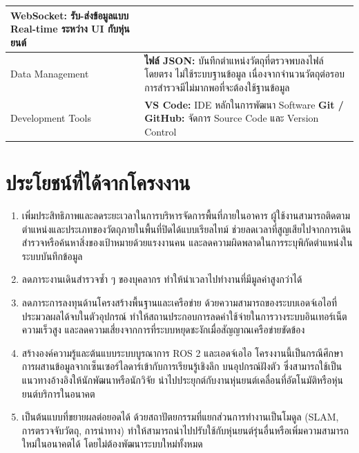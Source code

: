 \documentclass[a4paper,12pt]{report}
\begin{document}
\begin{table}[htbp]
\begin{tabularx}{\textwidth}{|>{\raggedright\arraybackslash}p{3.2cm}|X|}
\textbf{WebSocket:} รับ-ส่งข้อมูลแบบ Real-time ระหว่าง UI กับหุ่นยนต์ \\
\hline
Data Management &
\textbf{ไฟล์ JSON:} บันทึกตำแหน่งวัตถุที่ตรวจพบลงไฟล์โดยตรง ไม่ใช้ระบบฐานข้อมูล \newline
เนื่องจากจำนวนวัตถุต่อรอบการสำรวจมีไม่มากพอที่จะต้องใช้ฐานข้อมูล \\
\hline
Development Tools &
\textbf{VS Code:} IDE หลักในการพัฒนา Software \newline
\textbf{Git / GitHub:} จัดการ Source Code และ Version Control \\
\hline
\end{tabularx}
\end{table}

\section{ประโยชน์ที่ได้จากโครงงาน}

\begin{enumerate}[label=\arabic*., leftmargin=1.25cm, itemsep=6pt, topsep=6pt]
    \item เพิ่มประสิทธิภาพและลดระยะเวลาในการบริหารจัดการพื้นที่ภายในอาคาร
    ผู้ใช้งานสามารถติดตามตำแหน่งและประเภทของวัตถุภายในพื้นที่ปิดได้แบบเรียลไทม์
    ช่วยลดเวลาที่สูญเสียไปจากการเดินสำรวจหรือค้นหาสิ่งของเป้าหมายด้วยแรงงานคน
    และลดความผิดพลาดในการระบุพิกัดตำแหน่งในระบบบันทึกข้อมูล

    \item ลดภาระงานเดินสำรวจซ้ำ ๆ ของบุคลากร
    ทำให้นำเวลาไปทำงานที่มีมูลค่าสูงกว่าได้

    \item ลดภาระการลงทุนด้านโครงสร้างพื้นฐานและเครือข่าย
    ด้วยความสามารถของระบบเอดจ์เอไอที่ประมวลผลได้จบในตัวอุปกรณ์
    ทำให้สถานประกอบการลดค่าใช้จ่ายในการวางระบบอินเทอร์เน็ตความเร็วสูง
    และลดความเสี่ยงจากการที่ระบบหยุดชะงักเมื่อสัญญาณเครือข่ายขัดข้อง

    \item สร้างองค์ความรู้และต้นแบบระบบบูรณาการ ROS 2 และเอดจ์เอไอ
    โครงงานนี้เป็นกรณีศึกษาการผสานข้อมูลจากเซ็นเซอร์ไลดาร์เข้ากับการเรียนรู้เชิงลึก
    บนอุปกรณ์ฝังตัว ซึ่งสามารถใช้เป็นแนวทางอ้างอิงให้นักพัฒนาหรือนักวิจัย
    นำไปประยุกต์กับงานหุ่นยนต์เคลื่อนที่อัตโนมัติหรือหุ่นยนต์บริการในอนาคต

    \item เป็นต้นแบบที่ขยายผลต่อยอดได้
    ด้วยสถาปัตยกรรมที่แยกส่วนการทำงานเป็นโมดูล
    (SLAM, การตรวจจับวัตถุ, การนำทาง)
    ทำให้สามารถนำไปปรับใช้กับหุ่นยนต์รุ่นอื่นหรือเพิ่มความสามารถใหม่ในอนาคตได้
    โดยไม่ต้องพัฒนาระบบใหม่ทั้งหมด
\end{enumerate}
\end{document}
